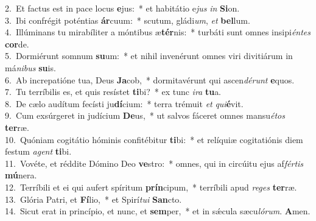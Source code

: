 {2.~}Et factus est in pace locus \textbf{e}jus:~* et habitátio e\textit{jus} \textit{in} \textbf{Si}on.\\
{3.~}Ibi confrégit poténtias \textbf{ár}cuum:~* scutum, gládi\textit{um}, \textit{et} \textbf{bel}lum.\\
{4.~}Illúminans tu mirabíliter a móntibus æ\textbf{tér}nis:~* turbáti sunt omnes insipi\textit{én}\textit{tes} \textbf{cor}de.\\
{5.~}Dormiérunt somnum \textbf{su}um:~* et nihil invenérunt omnes viri divitiárum in má\textit{ni}\textit{bus} \textbf{su}is.\\
{6.~}Ab increpatióne tua, Deus \textbf{Ja}cob,~* dormitavérunt qui ascen\textit{dé}\textit{runt} \textbf{e}quos.\\
{7.~}Tu terríbilis es, et quis resístet \textbf{ti}bi?~* ex tunc \textit{i}\textit{ra} \textbf{tu}a.\\
{8.~}De cælo audítum fecísti ju\textbf{dí}cium:~* terra trémuit \textit{et} \textit{qui}\textbf{é}vit.\\
{9.~}Cum exsúrgeret in judícium \textbf{De}us,~* ut salvos fáceret omnes mansu\textit{é}\textit{tos} \textbf{ter}ræ.\\
{10.~}Quóniam cogitátio hóminis confitébitur \textbf{ti}bi:~* et relíquiæ cogitatiónis diem festum \textit{a}\textit{gent} \textbf{ti}bi.\\
{11.~}Vovéte, et réddite Dómino Deo \textbf{ve}stro:~* omnes, qui in circúitu ejus af\textit{fér}\textit{tis} \textbf{mú}nera.\\
{12.~}Terríbili et ei qui aufert spíritum \textbf{prín}cipum,~* terríbili apud \textit{re}\textit{ges} \textbf{ter}ræ.\\
{13.~}Glória Patri, et \textbf{Fí}lio,~* et Spirí\textit{tu}\textit{i} \textbf{San}cto.\\
{14.~}Sicut erat in princípio, et nunc, et \textbf{sem}per,~* et in sǽcula sæcu\textit{ló}\textit{rum}. \textbf{A}men.\\
